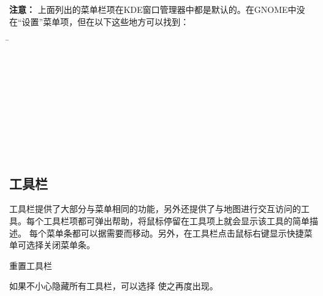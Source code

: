 \textbf{注意：} \nix 上面列出的菜单栏项在KDE窗口管理器中都是默认的。在GNOME中没在“设置”菜单项，但在以下这些地方可以找到：

\begin{tabbing}
 \hspace{3cm}\=
 \\
 \hspace{3cm}\>
\\
 \hspace{3cm}\>
\\
 \hspace{3cm}\>
\\
\hspace{3cm}\>
 \\
 \hspace{3cm}\>
 \\
   \hspace{3cm}\>
 \\
 \hspace{3cm}\>
 \\
 \hspace{3cm}\>
 \\
 \hspace{3cm}\>
 \\
\end{tabbing}


\subsection{工具栏}\label{label_toolbars}

工具栏提供了大部分与菜单相同的功能，另外还提供了与地图进行交互访问的工具。每个工具栏项都可弹出帮助，将鼠标停留在工具项上就会显示该工具的简单描述。
每个菜单条都可以据需要而移动。另外，在工具栏点击鼠标右键显示快捷菜单可选择关闭菜单条。

\begin{Tip}
\caption{\textsc{重置工具栏}} 
如果不小心隐藏所有工具栏，可以选择  \arrow {} 使之再度出现。
\end{Tip}

